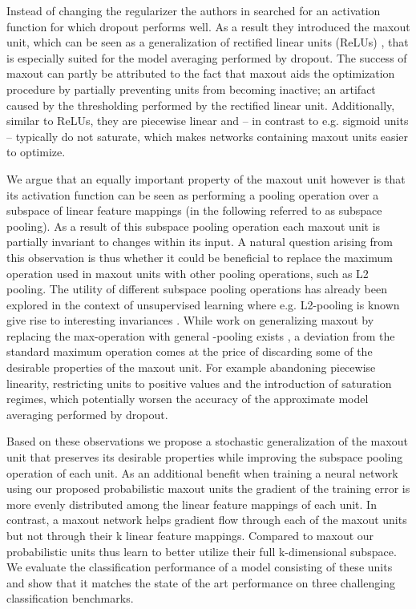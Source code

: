 \documentclass{article} \pdfoutput=1
\begin{document}
Instead of changing the regularizer the authors in
\cite{Goodfellow2013} searched for an activation function for which
dropout performs well. As a result they introduced the maxout unit,
which can be seen as a generalization of rectified linear units
(ReLUs) \cite{Nair2010,Glorot2011}, that is especially suited for the
model averaging performed by dropout. The success of maxout can partly
be attributed to the fact that maxout aids the optimization procedure
by partially preventing units from becoming inactive; an artifact
caused by the thresholding performed by the rectified linear
unit. Additionally, similar to ReLUs, they are piecewise linear
and -- in contrast to e.g. sigmoid units -- typically do not saturate,
which makes networks containing maxout units easier to optimize.


We argue that an equally important property of the maxout unit however
is that its activation function can be seen as performing a pooling
operation over a subspace of  linear feature mappings (in the
following referred to as subspace pooling). As a result of this
subspace pooling operation each maxout unit is partially invariant to
changes within its input. A natural question arising from this
observation is thus whether it could be beneficial to replace the
maximum operation used in maxout units with other pooling operations,
such as L2 pooling. The utility of different subspace pooling
operations has already been explored in the context of unsupervised
learning where e.g. L2-pooling is known give rise to interesting
invariances \cite{Hyvarinnen2009,Bergstra2009,Zou2012}. While work on
generalizing maxout by replacing the max-operation with general
-pooling exists \cite{Gulcere2013}, a deviation from the standard
maximum operation comes at the price of discarding some of the
desirable properties of the maxout unit. For example abandoning piecewise
linearity, restricting units to positive values and the introduction
of saturation regimes, which potentially worsen the accuracy of the
approximate model averaging performed by dropout.

Based on these observations we propose a stochastic generalization of
the maxout unit that preserves its desirable properties while
improving the subspace pooling operation of each unit. As an
additional benefit when training a neural network using our proposed
probabilistic maxout units the gradient of the training error is more
evenly distributed among the linear feature mappings of each unit. In
contrast, a maxout network helps gradient flow through each of the
maxout units but not through their k linear feature mappings.
Compared to maxout our probabilistic units thus learn to better
utilize their full k-dimensional subspace. We evaluate the
classification performance of a model consisting of these units and
show that it matches the state of the art performance on three
challenging classification benchmarks.
\end{document}
